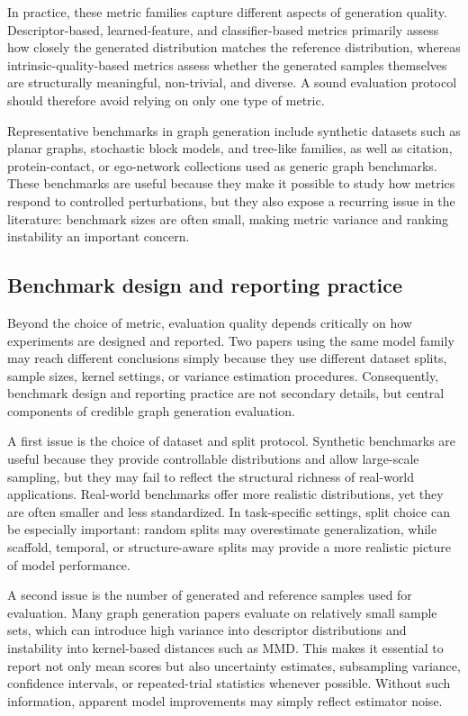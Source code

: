 \documentclass{article}
\begin{document}
In practice, these metric families capture different aspects of generation quality. Descriptor-based, learned-feature, and classifier-based metrics primarily assess how closely the generated distribution matches the reference distribution, whereas intrinsic-quality-based metrics assess whether the generated samples themselves are structurally meaningful, non-trivial, and diverse. A sound evaluation protocol should therefore avoid relying on only one type of metric.

Representative benchmarks in graph generation include synthetic datasets such as planar graphs, stochastic block models, and tree-like families, as well as citation, protein-contact, or ego-network collections used as generic graph benchmarks. These benchmarks are useful because they make it possible to study how metrics respond to controlled perturbations, but they also expose a recurring issue in the literature: benchmark sizes are often small, making metric variance and ranking instability an important concern.

\subsection{Benchmark design and reporting practice}
\label{subsec:benchmark_reporting}

Beyond the choice of metric, evaluation quality depends critically on how experiments are designed and reported. Two papers using the same model family may reach different conclusions simply because they use different dataset splits, sample sizes, kernel settings, or variance estimation procedures. Consequently, benchmark design and reporting practice are not secondary details, but central components of credible graph generation evaluation.

A first issue is the choice of dataset and split protocol. Synthetic benchmarks are useful because they provide controllable distributions and allow large-scale sampling, but they may fail to reflect the structural richness of real-world applications. Real-world benchmarks offer more realistic distributions, yet they are often smaller and less standardized. In task-specific settings, split choice can be especially important: random splits may overestimate generalization, while scaffold, temporal, or structure-aware splits may provide a more realistic picture of model performance.

A second issue is the number of generated and reference samples used for evaluation. Many graph generation papers evaluate on relatively small sample sets, which can introduce high variance into descriptor distributions and instability into kernel-based distances such as MMD. This makes it essential to report not only mean scores but also uncertainty estimates, subsampling variance, confidence intervals, or repeated-trial statistics whenever possible. Without such information, apparent model improvements may simply reflect estimator noise.
\end{document}
